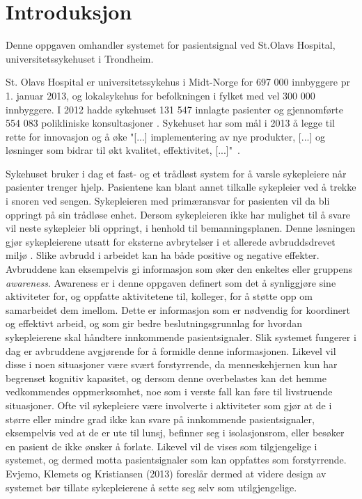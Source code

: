 \chapter{Introduksjon}
\label{chp: introduksjon}

Denne oppgaven omhandler systemet for pasientsignal ved St.Olavs Hospital, universitetssykehuset i Trondheim. 

\noindent
St. Olavs Hospital er universitetssykehus i Midt-Norge for 697 000 innbyggere pr 1. januar 2013, og lokalsykehus for befolkningen i fylket med vel 300 000 innbyggere. I 2012 hadde sykehuset 131 547 innlagte pasienter og gjennomførte 554 083 polikliniske konsultasjoner \cite{stolavs}. Sykehuset har som mål i 2013 å legge til rette for innovasjon og å øke "[...] implementering av nye produkter, [...] og løsninger som bidrar til økt kvalitet, effektivitet, [...]"\ \cite{styring13}.

\noindent
Sykehuset bruker i dag et fast- og et trådløst system for å varsle sykepleiere når pasienter trenger hjelp. Pasientene kan blant annet tilkalle sykepleier ved å trekke i snoren ved sengen. Sykepleieren med primæransvar for pasienten vil da bli oppringt på sin trådløse enhet. Dersom sykepleieren ikke har mulighet til å svare vil neste sykepleier bli oppringt, i henhold til bemanningsplanen. Denne løsningen gjør sykepleierene utsatt for eksterne avbrytelser i et allerede avbruddsdrevet miljø \cite{Klemets12}. Slike avbrudd i arbeidet kan ha både positive og negative effekter. Avbruddene kan eksempelvis gi informasjon som øker den enkeltes eller gruppens \emph{awareness}. Awareness er i denne oppgaven definert som det å synliggjøre sine aktiviteter for, og oppfatte aktivitetene til, kolleger, for å støtte opp om samarbeidet dem imellom. Dette er informasjon som er nødvendig for koordinert og effektivt arbeid, og som gir bedre beslutningsgrunnlag for hvordan sykepleierene skal håndtere innkommende pasientsignaler. Slik systemet fungerer i dag er avbruddene avgjørende for å formidle denne informasjonen. Likevel vil disse i noen situasjoner være svært forstyrrende, da menneskehjernen kun har begrenset kognitiv kapasitet, og dersom denne overbelastes kan det hemme vedkommendes oppmerksomhet, noe som i verste fall kan føre til livstruende situasjoner. 
Ofte vil sykepleiere være involverte i aktiviteter som gjør at de i større eller mindre grad ikke kan svare på innkommende pasientsignaler, eksempelvis ved at de er ute til lunsj, befinner seg i isolasjonsrom, eller besøker en pasient de ikke ønsker å forlate. Likevel vil de vises som tilgjengelige i systemet, og dermed motta pasientsignaler som kan oppfattes som forstyrrende. Evjemo, Klemets og Kristiansen (2013) foreslår dermed at videre design av systemet bør tillate sykepleierene å sette seg selv som utilgjengelige. 

